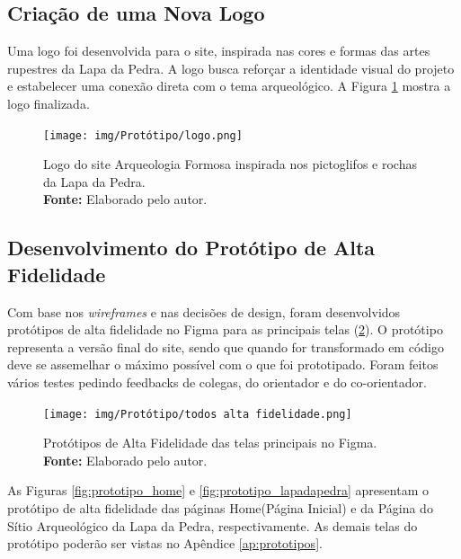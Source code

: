 \subsection{Criação de uma Nova Logo}
Uma logo foi desenvolvida para o site, inspirada nas cores e formas das artes rupestres da Lapa da Pedra. A logo busca reforçar a identidade visual do projeto e estabelecer uma conexão direta com o tema arqueológico. A Figura \ref{fig:logo_arqueologia_formosa} mostra a logo finalizada.
\begin{figure}[H]
    \centering
    \texttt{[image: img/Protótipo/logo.png]}
    \caption{ Logo do site Arqueologia Formosa inspirada nos pictoglifos e rochas da Lapa da Pedra. \\
        \textbf{Fonte:} Elaborado pelo autor.}
    \label{fig:logo_arqueologia_formosa}
\end{figure}


\subsection{Desenvolvimento do Protótipo de Alta Fidelidade}
Com base nos \textit{wireframes} e nas decisões de design, foram desenvolvidos protótipos de alta fidelidade no Figma para as principais telas (\ref{fig:prototipos_alta_fidelidade}). O protótipo representa a versão final do site, sendo que quando for transformado em código deve se assemelhar o máximo possível com o que foi prototipado. Foram feitos vários testes pedindo feedbacks de colegas, do orientador e do co-orientador. 

\begin{figure}[H]
    \centering
    \texttt{[image: img/Protótipo/todos alta fidelidade.png]}
    \caption{ Protótipos de Alta Fidelidade das telas principais no Figma. \\
        \textbf{Fonte:} Elaborado pelo autor.}
    \label{fig:prototipos_alta_fidelidade}
\end{figure}

As Figuras \ref{fig:prototipo_home} e \ref{fig:prototipo_lapadapedra} apresentam o protótipo de alta fidelidade das páginas Home(Página Inicial) e da Página do Sítio Arqueológico da Lapa da Pedra, respectivamente. As demais telas do protótipo poderão ser vistas no Apêndice \ref{ap:prototipos}.

